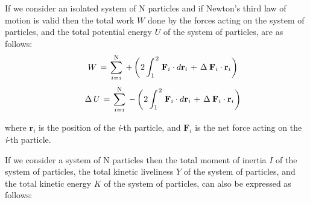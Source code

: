 \documentclass[10pt,fleqn]{article}
\newcommand{\mI}{I}
\newcommand{\mY}{Y}
\newcommand{\mK}{K}
\newcommand{\mW}{W}
\newcommand{\mU}{U}
\newcommand{\ri}{_i}
\newcommand{\vR}{\mathbf{r}}
\newcommand{\vF}{\mathbf{F}}
\begin{document}
\vspace{+0.90em}

\par If we consider an isolated system of N particles and if Newton's third law of motion is valid then the total work $\mW$ done by the forces acting on the system of particles, and the total potential energy $\mU$ of the system of particles, are as follows:
\medskip
\begin{eqnarray*}
\hspace{+1.50em} \mW \hspace{+0.12em} = \hspace{+0.12em} \sum_{i={\scriptscriptstyle 1}}^{\mathrm N} \hspace{+0.24em} + \left( \hspace{+0.06em} 2 \int_1^{\hspace{+0.09em} 2} \hspace{+0.12em} \vF\ri \cdot d\vR\ri \hspace{+0.12em} + \hspace{+0.12em} \Delta \hspace{+0.24em} \vF\ri \cdot \vR\ri \hspace{+0.06em} \right)
\end{eqnarray*}
\begin{eqnarray*}
\hspace{+1.50em} \Delta \hspace{+0.18em} \mU \hspace{+0.12em} = \hspace{+0.12em} \sum_{i={\scriptscriptstyle 1}}^{\mathrm N} \hspace{+0.24em} - \left( \hspace{+0.06em} 2 \int_1^{\hspace{+0.09em} 2} \hspace{+0.12em} \vF\ri \cdot d\vR\ri \hspace{+0.12em} + \hspace{+0.12em} \Delta \hspace{+0.24em} \vF\ri \cdot \vR\ri \hspace{+0.06em} \right)
\end{eqnarray*}
\smallskip
\par \noindent where $\vR\ri$ is the position of the \textit{i}-th particle, and $\vF\ri$ is the net force acting on the \textit{i}-th particle.
\bigskip
\par If we consider a system of N particles then the total moment of inertia $\mI$ of the system of particles, the total kinetic liveliness $\mY$ of the system of particles, and the total kinetic energy $\mK$ of the system of particles, can also be expressed as follows:
\end{document}
